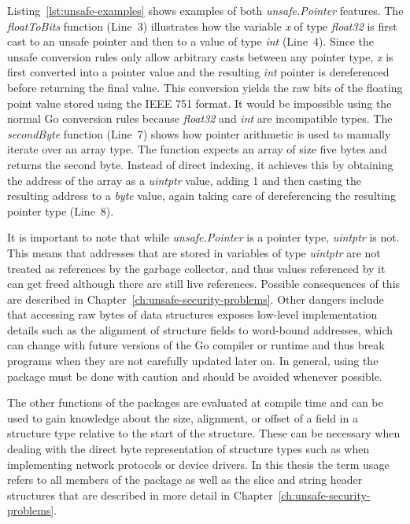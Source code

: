 Listing~\ref{lst:unsafe-examples} shows examples of both \textit{unsafe.Pointer} features.
The \textit{floatToBits} function (Line~3) illustrates how the variable \textit{x} of type \textit{float32} is first
cast to an unsafe pointer and then to a value of type \textit{int} (Line~4).
Since the unsafe conversion rules only allow arbitrary casts between any pointer type, \textit{x} is first converted
into a pointer value and the resulting \textit{int} pointer is dereferenced before returning the final value.
This conversion yields the raw bits of the floating point value stored using the IEEE 751 format.
It would be impossible using the normal Go conversion rules because \textit{float32} and \textit{int} are incompatible
types.
The \textit{secondByte} function (Line~7) shows how pointer arithmetic is used to manually iterate over an array type.
The function expects an array of size five bytes and returns the second byte.
Instead of direct indexing, it achieves this by obtaining the address of the array as a \textit{uintptr} value, adding
1 and then casting the resulting address to a \textit{byte} value, again taking care of dereferencing the resulting
pointer type (Line~8).



It is important to note that while \textit{unsafe.Pointer} is a pointer type, \textit{uintptr} is not.
This means that addresses that are stored in variables of type \textit{uintptr} are not treated as references by the
garbage collector, and thus values referenced by it can get freed although there are still live references.
Possible consequences of this are described in Chapter~\ref{ch:unsafe-security-problems}.
Other dangers include that accessing raw bytes of data structures exposes low-level implementation details such as
the alignment of structure fields to word-bound addresses, which can change with future versions of the Go compiler or
runtime and thus break programs when they are not carefully updated later on.
In general, using the \unsafe{} package must be done with caution and should be avoided whenever possible.

The other functions of the \unsafe{} packages are evaluated at compile time and can be used to gain knowledge about
the size, alignment, or offset of a field in a structure type relative to the start of the structure.
These can be necessary when dealing with the direct byte representation of structure types such as when implementing
network protocols or device drivers.
In this thesis the term \unsafe{} usage refers to all members of the \unsafe{} package as well as the slice and string
header structures that are described in more detail in Chapter~\ref{ch:unsafe-security-problems}.


